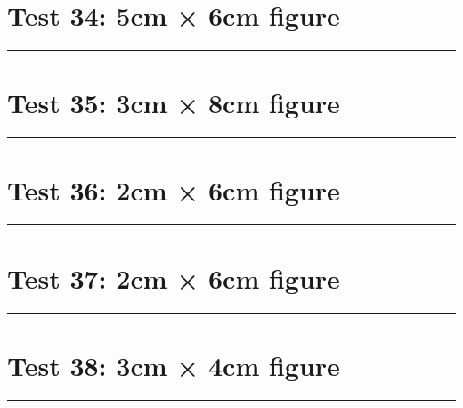 \documentclass[a4paper,11pt]{article}
\begin{document}
\section*{Test 34: 5cm × 6cm figure}
\begin{swarmwrap}%
  \begin{minipage}[t]{5cm}
    \centering
    \rule{\linewidth}{6cm}
  \end{minipage}%
\end{swarmwrap}%
\swarmwrapnext
\lipsum[30]
\lipsum[31]
\lipsum[32]
\lipsum[33]
\lipsum[34]
\section*{Test 35: 3cm × 8cm figure}
\begin{swarmwrap}%
  \begin{minipage}[t]{3cm}
    \centering
    \rule{\linewidth}{8cm}
  \end{minipage}%
\end{swarmwrap}%
\swarmwrapnext
\lipsum[118]
\lipsum[119]
\lipsum[120]
\lipsum[121]
\section*{Test 36: 2cm × 6cm figure}
\begin{swarmwrap}%
  \begin{minipage}[t]{2cm}
    \centering
    \rule{\linewidth}{6cm}
  \end{minipage}%
\end{swarmwrap}%
\swarmwrapnext
\lipsum[131]
\lipsum[132]
\lipsum[133]
\lipsum[134]
\section*{Test 37: 2cm × 6cm figure}
\begin{swarmwrap}%
  \begin{minipage}[t]{2cm}
    \centering
    \rule{\linewidth}{6cm}
  \end{minipage}%
\end{swarmwrap}%
\swarmwrapnext
\lipsum[41]
\lipsum[42]
\lipsum[43]
\lipsum[44]
\section*{Test 38: 3cm × 4cm figure}
\begin{swarmwrap}%
  \begin{minipage}[t]{3cm}
    \centering
    \rule{\linewidth}{4cm}
  \end{minipage}%
\end{swarmwrap}%
\swarmwrapnext
\lipsum[84]
\lipsum[85]
\lipsum[86]
\end{document}
